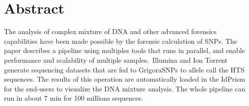 \documentclass[../main.tex]{subfiles}
\begin{document}
\section{Abstract}

The analysis of complex mixture of DNA and other advanced forensics capabilities have been made possible by the forensic calculation of SNPs. The paper describes a pipeline using multiples tools that runs in parallel, and enable performance and scalability of multiple samples.\
Illumina and Ion Torrent generate sequencing datasets that are fed to GrigoraSNPs to allele call the HTS sequences. The results of this operation are automatically loaded in the IdPrism for the end-users to visualize the DNA mixture analysis. The whole pipeline can run in about 7 min for 100 millions sequences.
\end{document}
